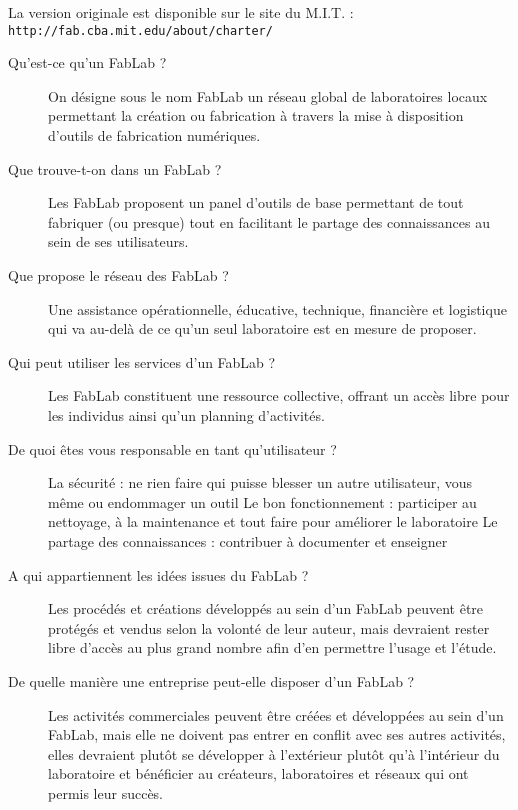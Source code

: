 {\small \begin{center}
La version originale est disponible sur le site du M.I.T. : \\ \texttt{http://fab.cba.mit.edu/about/charter/}
\end{center}}
\begin{description}
  \item[Qu'est-ce qu'un FabLab ?]
On désigne sous le nom FabLab un réseau global de laboratoires locaux permettant la création ou fabrication à travers la mise à disposition d'outils de fabrication numériques.

\item[Que trouve-t-on dans un FabLab ?]
Les FabLab proposent un panel d'outils de base permettant de tout fabriquer (ou presque) tout en facilitant le partage des connaissances au sein de ses utilisateurs.

\item[Que propose le réseau des FabLab ?]
Une assistance opérationnelle, éducative, technique, financière et logistique qui va au-delà de ce qu'un seul laboratoire est en mesure de proposer.

\item[Qui peut utiliser les services d'un FabLab ?]
Les FabLab constituent une ressource collective, offrant un accès libre pour les individus ainsi qu'un planning d'activités.

\item[De quoi êtes vous responsable en tant qu'utilisateur ?]
La sécurité : ne rien faire qui puisse blesser un autre utilisateur, vous même ou endommager un outil
Le bon fonctionnement : participer au nettoyage, à la maintenance et tout faire pour améliorer le laboratoire
Le partage des connaissances : contribuer à documenter et enseigner
 

\item[A qui appartiennent les idées issues du FabLab ?]
Les procédés et créations développés au sein d'un FabLab peuvent être protégés et vendus selon la volonté de leur auteur, mais devraient rester libre d'accès au plus grand nombre afin d'en permettre l'usage et l'étude.

\item[De quelle manière une entreprise peut-elle disposer d'un FabLab ?]
Les activités commerciales peuvent être créées et développées au sein d'un FabLab, mais elle ne doivent pas entrer en conflit avec ses autres activités, elles devraient plutôt se développer à l'extérieur plutôt qu'à l'intérieur du laboratoire et bénéficier au créateurs, laboratoires et réseaux qui ont permis leur succès.
\end{description}
